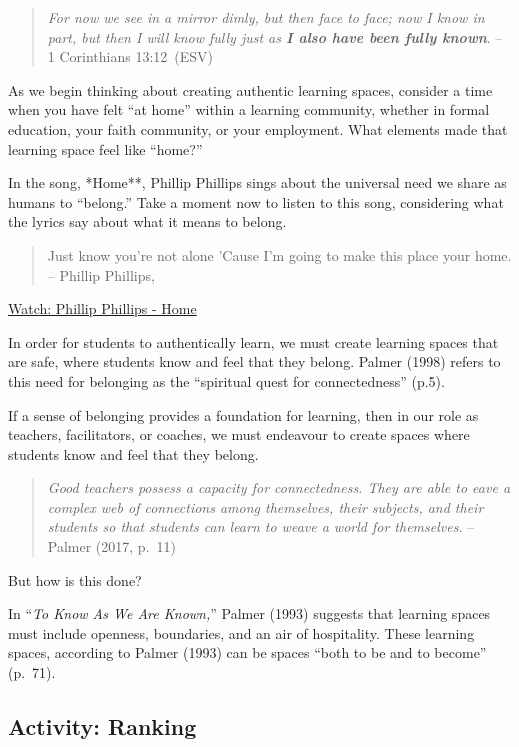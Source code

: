 \documentclass[
]{book}
\begin{document}
\begin{quote}
\emph{For now we see in a mirror dimly, but then face to face; now I know in part, but then I will know fully just as \textbf{I also have been fully known}}. -- 1 Corinthians 13:12~(ESV)
\end{quote}

As we begin thinking about creating authentic learning spaces, consider a time when you have felt ``at home'' within a learning community, whether in formal education, your faith community, or your employment. What elements made that learning space feel like ``home?''

In the song, *Home**, Phillip Phillips sings about the universal need we share as humans to ``belong.'' Take a moment now to listen to this song, considering what the lyrics say about what it means to belong.

\begin{quote}
Just know you're not alone
'Cause I'm going to make this place your home.
-- Phillip Phillips,
\end{quote}

\href{https://www.youtube.com/watch?v=HoRkntoHkIE}{Watch: Phillip Phillips - Home}

In order for students to authentically learn, we must create learning spaces that are safe, where students know and feel that they belong. Palmer (1998) refers to this need for belonging as the ``spiritual quest for connectedness'' (p.5).

If a sense of belonging provides a foundation for learning, then in our role as teachers, facilitators, or coaches, we must endeavour to create spaces where students know and feel that they belong.

\begin{quote}
\emph{Good teachers possess a capacity for connectedness. They are able to eave a complex web of connections among themselves, their subjects, and their students so that students can learn to weave a world for themselves.} -- Palmer (2017, p.~11)
\end{quote}

But how is this done?

In ``\emph{To Know As We Are Known,}'' Palmer (1993) suggests that learning spaces must include openness, boundaries, and an air of hospitality. These learning spaces, according to Palmer (1993) can be spaces ``both to be and to become'' (p.~71).

\hypertarget{activity-ranking}{%
\subsection*{Activity: Ranking}\label{activity-ranking}}
\end{document}

